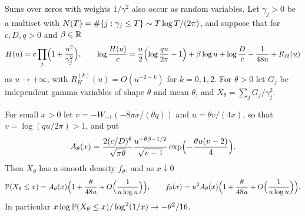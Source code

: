 Sums over zeros with weights $1/\gamma^2$ also occur as random variables. Let $\gamma_j>0$ be a
multiset with $N(T)=\#\{j:\gamma_j\le T\}\sim T\log T/(2\pi)$, and suppose that for
$c,D,q>0$ and $\beta\in\mathbb{R}$
\[
 H(u)=c\prod_j\Bigl(1+\frac{u^2}{\gamma_j^2}\Bigr),\qquad
 \log\frac{H(u)}c=\frac u2\Bigl(\log\frac{qu}{2\pi}-1\Bigr)+\beta\log u+\log\frac Dc-\frac1{48u}+R_H(u)
\]
as $u\to+\infty$, with $R_H^{(k)}(u)=O(u^{-2-k})$ for $k=0,1,2$. For $\theta>0$ let $G_j$ be
independent gamma variables of shape $\theta$ and mean $\theta$, and $X_\theta=\sum_jG_j/\gamma_j^2$.

\begin{theorem}\label{ana:thm:gammasum}
For small $x>0$ let $v=-W_{-1}(-8\pi x/(\theta q))$ and $u=\theta v/(4x)$, so that
$v=\log(qu/2\pi)>1$, and put
\[
 A_\theta(x)=\frac{2(c/D)^\theta}{\sqrt{\pi\theta}}\frac{u^{-\theta\beta-1/2}}{\sqrt{v-1}}
 \exp\Bigl(-\frac{\theta u(v-2)}4\Bigr).
\]
Then $X_\theta$ has a smooth density $f_\theta$, and as $x\downarrow0$
\[
 \mathbb{P}(X_\theta\le x)=A_\theta(x)\Bigl(1+\frac\theta{48u}+O\Bigl(\frac1{u\log u}\Bigr)\Bigr),\qquad
 f_\theta(x)=u^2A_\theta(x)\Bigl(1+\frac\theta{48u}+O\Bigl(\frac1{u\log u}\Bigr)\Bigr).
\]
In particular $x\log\mathbb{P}(X_\theta\le x)/\log^2(1/x)\to-\theta^2/16$.
\end{theorem}


